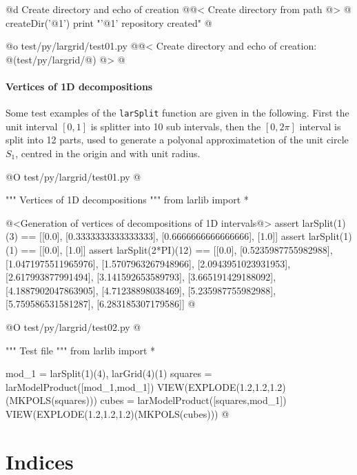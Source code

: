 \documentclass[11pt,oneside]{article}	%
\begin{document}
@d Create directory and echo of creation
@{@< Create directory from path @>
@%
createDir('@1')
print "'@1' repository created"
@}

@o test/py/largrid/test01.py
@{@< Create directory  and echo of creation: @(test/py/largrid/@) @>
@}


\paragraph{Vertices of 1D decompositions}
Some test examples of the \texttt{larSplit} function are given in the following. First the unit interval $[0,1]$ is splitter into 10 sub intervals, then the $[0,2\pi]$ interval is split into 12 parts, used to generate a polyonal approximatetion of the unit circle $S_1$, centred in the origin and with unit radius.

@O test/py/largrid/test01.py
@{""" Vertices of 1D decompositions """
from larlib import *

@<Generation of vertices of decompositions of 1D intervals@>
assert larSplit(1)(3) == [[0.0], [0.3333333333333333], [0.6666666666666666], [1.0]]
assert larSplit(1)(1) == [[0.0], [1.0]]
assert larSplit(2*PI)(12) == [[0.0], [0.5235987755982988], [1.0471975511965976], 
[1.5707963267948966], [2.0943951023931953], [2.617993877991494], 
[3.141592653589793], [3.665191429188092], [4.1887902047863905], 
[4.71238898038469], [5.235987755982988], [5.759586531581287], 
[6.283185307179586]]
@}


@O test/py/largrid/test02.py
@{""" Test file """
from larlib import *

mod_1 = larSplit(1)(4), larGrid(4)(1)
squares = larModelProduct([mod_1,mod_1])
VIEW(EXPLODE(1.2,1.2,1.2)(MKPOLS(squares)))
cubes = larModelProduct([squares,mod_1])
VIEW(EXPLODE(1.2,1.2,1.2)(MKPOLS(cubes)))
@}


\section{Indices}
\label{sec:indices}
\end{document}
